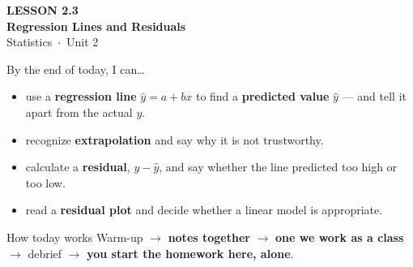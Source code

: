 \documentclass[aspectratio=169, 11pt]{beamer}
\begin{document}
{
\begin{frame}[plain]
  \vspace{2.8cm}\hspace{0.55cm}%
  \begin{minipage}{0.9\textwidth}
    {\color{goldacc}\bfseries\small LESSON 2.3}\\[0.5cm]
    {\color{white}\bfseries\LARGE Regression Lines and Residuals}\\[1.2cm]
    {\color{skymid}\small Statistics~$\cdot$~Unit 2}
  \end{minipage}
\end{frame}
}

\newcommand{\redink}[1]{{\color{redacc}\bfseries #1}}

\begin{frame}[t, plain]
  By the end of today, I can\ldots
  \begin{itemize}\setlength{\itemsep}{5pt}
    \item use a \textbf{regression line} $\hat{y}=a+bx$ to find a \textbf{predicted value}
          $\hat{y}$ --- and tell it apart from the actual $y$.
    \item recognize \textbf{extrapolation} and say why it is not trustworthy.
    \item calculate a \textbf{residual}, $y-\hat{y}$, and say whether the line predicted too
          high or too low.
    \item read a \textbf{residual plot} and decide whether a linear model is appropriate.
  \end{itemize}
  \begin{block}{How today works}
    Warm-up $\to$ \textbf{notes together} $\to$ \textbf{one we work as a class} $\to$
    debrief $\to$ \textbf{you start the homework here, alone}.
  \end{block}
\end{frame}
\end{document}
